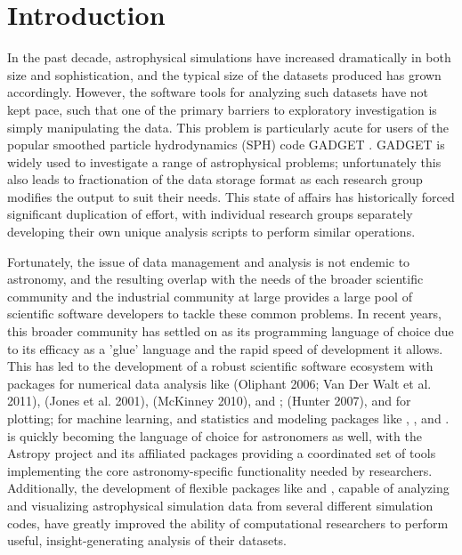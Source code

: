 \section{Introduction}
\label{intro}

In the past decade, astrophysical simulations have increased dramatically in both size and sophistication, and the typical size of the datasets produced has grown accordingly.  
However, the software tools for analyzing such datasets have not kept pace, such that one of the primary barriers to exploratory investigation is simply manipulating the data.  
This problem is particularly acute for users of the popular smoothed particle hydrodynamics (SPH) code GADGET \citep{SpringelYoshidaWhite2001,Springel2005}.  
GADGET is widely used to investigate a range of astrophysical problems; unfortunately this also leads to fractionation of the data storage format as each research group modifies the output to suit their needs.
This state of affairs has historically forced significant duplication of effort, with individual research groups separately developing their own unique analysis scripts to perform similar operations.

Fortunately, the issue of data management and analysis is not endemic to astronomy, and the resulting overlap with the needs of the broader scientific community and the industrial community at large provides a large pool of scientific software developers to tackle these common problems.
In recent years, this broader community has settled on  as its programming language of choice due to its efficacy as a 'glue' language and the rapid speed of development it allows.  
This has led to the development of a robust scientific software ecosystem with packages for numerical data analysis like  (Oliphant 2006; Van Der Walt et al. 2011),  (Jones et al. 2001),  (McKinney 2010), and ;  (Hunter 2007), and  for plotting;  for machine learning, and statistics and modeling packages like , , and  \citep{Foreman-Mackeyetal2013}.
 is quickly becoming the language of choice for astronomers as well, with the Astropy project \citep{Robitailleetal2013} and its affiliated packages providing a coordinated set of tools implementing the core astronomy-specific functionality needed by researchers. 
Additionally, the development of flexible  packages like  \citep{Turketal2011} and  \citep{Pontzenetal2013}, capable of analyzing and visualizing astrophysical simulation data from several different simulation codes, have greatly improved the ability of computational researchers to perform useful, insight-generating analysis of their datasets.

